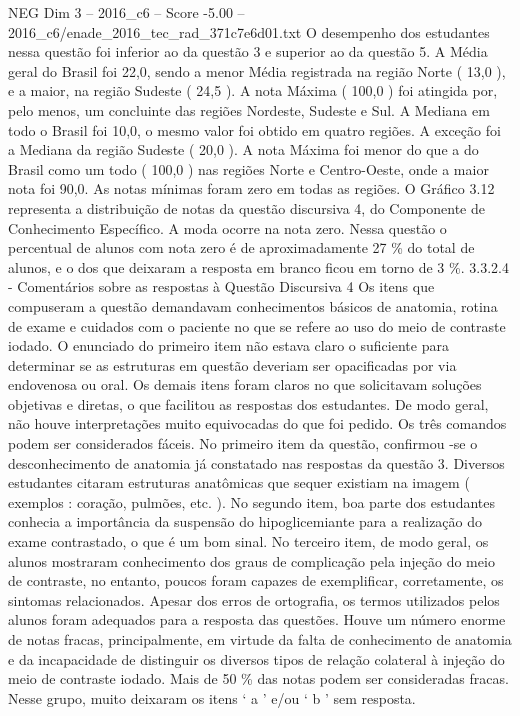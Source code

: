 \begin{textsample}{NEG Dim 3 – 2016\_c6 – Score -5.00 – 2016\_c6/enade\_2016\_tec\_rad\_371c7e6d01.txt}
O desempenho dos estudantes nessa questão foi inferior ao da questão 3 e superior ao da questão 5.
A Média geral do Brasil foi 22,0, sendo a menor Média registrada na região Norte ( 13,0 ), e a maior, na região Sudeste ( 24,5 ).
A nota Máxima ( 100,0 ) foi atingida por, pelo menos, um concluinte das regiões Nordeste, Sudeste e Sul.
A Mediana em todo o Brasil foi 10,0, o mesmo valor foi obtido em quatro regiões.
A exceção foi a Mediana da região Sudeste ( 20,0 ).
A nota Máxima foi menor do que a do Brasil como um todo ( 100,0 ) nas regiões Norte e Centro-Oeste, onde a maior nota foi 90,0.
As notas mínimas foram zero em todas as regiões.
O Gráfico 3.12 representa a distribuição de notas da questão discursiva 4, do Componente de Conhecimento Específico.
A moda ocorre na nota zero.
Nessa questão o percentual de alunos com nota zero é de aproximadamente 27 \% do total de alunos, e o dos que deixaram a resposta em branco ficou em torno de 3 \%. 3.3.2.4 - Comentários sobre as respostas à Questão Discursiva 4 Os itens que compuseram a questão demandavam conhecimentos básicos de anatomia, rotina de exame e cuidados com o paciente no que se refere ao uso do meio de contraste iodado.
O enunciado do primeiro item não estava claro o suficiente para determinar se as estruturas em questão deveriam ser opacificadas por via endovenosa ou oral.
Os demais itens foram claros no que solicitavam soluções objetivas e diretas, o que facilitou as respostas dos estudantes.
De modo geral, não houve interpretações muito equivocadas do que foi pedido.
Os três comandos podem ser considerados fáceis.
No primeiro item da questão, confirmou -se o desconhecimento de anatomia já constatado nas respostas da questão 3.
Diversos estudantes citaram estruturas anatômicas que sequer existiam na imagem ( exemplos : coração, pulmões, etc. ).
No segundo item, boa parte dos estudantes conhecia a importância da suspensão do hipoglicemiante para a realização do exame contrastado, o que é um bom sinal.
No terceiro item, de modo geral, os alunos mostraram conhecimento dos graus de complicação pela injeção do meio de contraste, no entanto, poucos foram capazes de exemplificar, corretamente, os sintomas relacionados.
Apesar dos erros de ortografia, os termos utilizados pelos alunos foram adequados para a resposta das questões.
Houve um número enorme de notas fracas, principalmente, em virtude da falta de conhecimento de anatomia e da incapacidade de distinguir os diversos tipos de relação colateral à injeção do meio de contraste iodado.
Mais de 50 \% das notas podem ser consideradas fracas.
Nesse grupo, muito deixaram os itens ‘ a ’ e/ou ‘ b ’ sem resposta.

\end{textsample}
